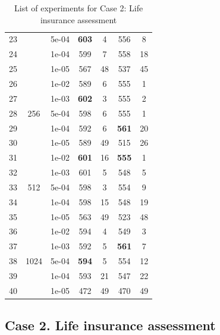 \begin{table}[h!]
{\begin{tabular}{c|c|c|c|c|c|c}
			23 &                      & 5e-04 & \textbf{603} & 4 & 556 & 8\\
			24 &                      & 1e-04 & 599 & 7 & 558 & 18\\
			25 &                      & 1e-05 & 567 & 48 & 537 & 45\\
			\hline
			26 & \multirow{5}{*}{256} & 1e-02 & 589 & 6 & 555 & 1\\
			27 &                      & 1e-03 & \textbf{602} & 3 & 555 & 2\\
			28 &                      & 5e-04 & 598 & 6 & 555 & 1\\
			29 &                      & 1e-04 & 592 & 6 & \textbf{561} & 20\\
			30 &                      & 1e-05 & 589 & 49 & 515 & 26\\
			\hline
			31 & \multirow{5}{*}{512} & 1e-02 & \textbf{601} & 16 & \textbf{555} & 1\\
			32 &                      & 1e-03 & 601 & 5 & 548 & 5\\
			33 &                      & 5e-04 & 598 & 3 & 554 & 9\\
			34 &                      & 1e-04 & 598 & 15 & 548 & 19\\
			35 &                      & 1e-05 & 563 & 49 & 523 & 48\\
			\hline
			36 & \multirow{5}{*}{1024} & 1e-02 & 594 & 4 & 549 & 3\\
			37 &                       & 1e-03 & 592 & 5 & \textbf{561} & 7\\
			38 &                       & 5e-04 & \textbf{594} & 5 & 554 & 12\\
			39 &                       & 1e-04 & 593 & 21 & 547 & 22\\
			40 &                       & 1e-05 & 472 & 49 & 470 & 49\\
			\hline			
		\end{tabular}
	}
	\caption[Life insurance assessment experiments]{List of experiments for Case 2: Life insurance assessment}
	\label{loss:tab:prudential}
\end{table}

\subsection{Case 2. Life insurance assessment}

